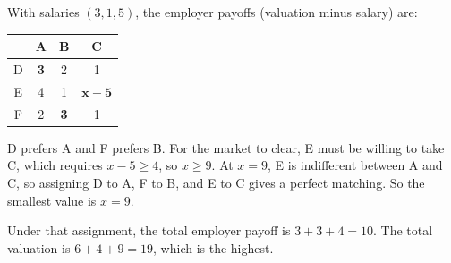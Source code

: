 \documentclass[newpages, arabicsubsec]{assignment}
\begin{document}
\begin{solution}
    With salaries \((3,1,5)\), the employer payoffs (valuation minus salary) are:

    \begin{table}[h]
        \centering
        \begin{tabular}{c|ccc}
              & A          & B          & C              \\
            \midrule
            D & \textbf{3} & 2          & 1              \\
            E & 4          & 1          & $\mathbf{x-5}$ \\
            F & 2          & \textbf{3} & 1              \\
        \end{tabular}
    \end{table}

    D prefers A and F prefers B. For the market to clear, E must be willing to take C, which requires \(x-5\geq4\), so \(x\geq9\). At \(x=9\), E is indifferent between A and C, so assigning D to A, F to B, and E to C gives a perfect matching. So the smallest value is \(x=9\).

    Under that assignment, the total employer payoff is \(3+3+4=10\). The total valuation is \(6+4+9=19\), which is the highest.
\end{solution}
\end{document}
